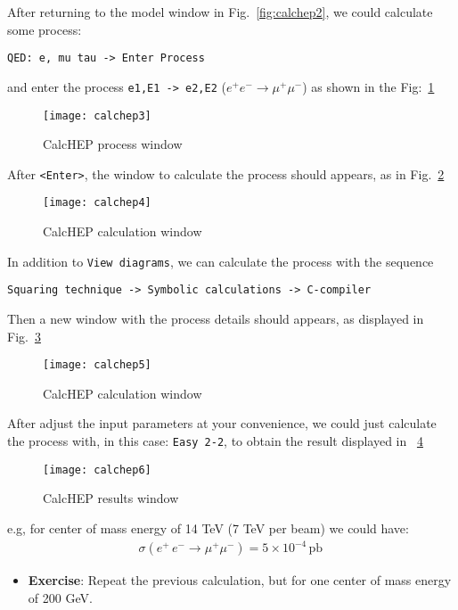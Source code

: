 \begin{frame}{}
After returning to the model window in Fig.~\ref{fig:calchep2}, we could calculate some process:
\begin{lstlisting}
QED: e, mu tau -> Enter Process 
\end{lstlisting}
and enter the process \lstinline{e1,E1 -> e2,E2} ($e^+ e^-\to \mu^+\mu^-$) as shown in the Fig:~\ref{fig:calchep3}
\begin{figure}
  \centering
  \texttt{[image: calchep3]}
  \caption{CalcHEP process window}
  \label{fig:calchep3}
\end{figure}
After \lstinline{<Enter>}, the window to calculate the process should appears, as in Fig.~\ref{fig:calchep4}
\begin{figure}
  \centering
  \texttt{[image: calchep4]}
  \caption{CalcHEP calculation window}
  \label{fig:calchep4}
\end{figure}
In addition to \lstinline{View diagrams}, we can calculate the process with the sequence
\begin{lstlisting}
Squaring technique -> Symbolic calculations -> C-compiler
\end{lstlisting}
Then a new window with the process details should appears, as displayed in Fig.~\ref{fig:calchep5}
\begin{figure}
  \centering
  \texttt{[image: calchep5]}
  \caption{CalcHEP calculation window}
  \label{fig:calchep5}
\end{figure}
After adjust the input parameters at your convenience, we could just calculate the process with, in this case: \lstinline{Easy 2-2}, to obtain the result displayed in ~\ref{fig:calchep6}
\begin{figure}
  \centering
  \texttt{[image: calchep6]}
  \caption{CalcHEP results window}
  \label{fig:calchep6}
\end{figure}
e.g, for center of mass energy of 14 TeV (7 TeV per beam) we could have:
\begin{align}
  \sigma(e^+\,e^-\to \mu^+\mu^-)=5\times 10^{-4}\,\text{pb}\,
\end{align}
\begin{itemize}
\item \textbf{Exercise}:
Repeat the previous calculation, but for one center of mass energy of 200 GeV.
\end{itemize}


\end{frame}
